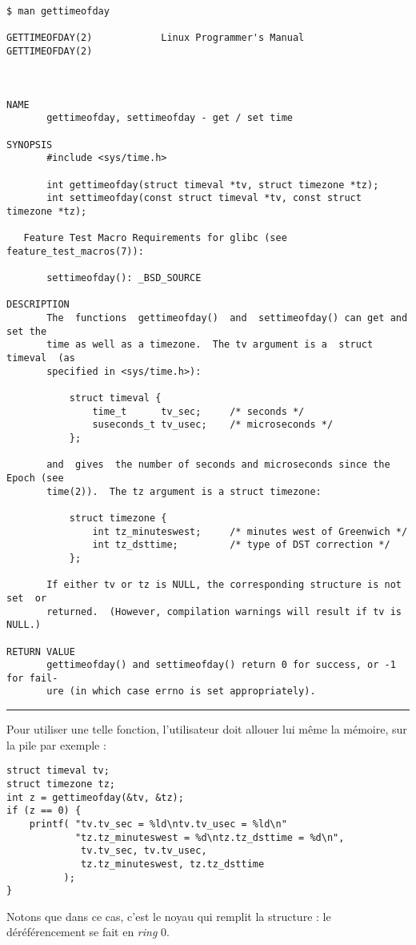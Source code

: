 \begin{verbatim}
$ man gettimeofday

GETTIMEOFDAY(2)            Linux Programmer's Manual           GETTIMEOFDAY(2)



NAME
       gettimeofday, settimeofday - get / set time

SYNOPSIS
       #include <sys/time.h>

       int gettimeofday(struct timeval *tv, struct timezone *tz);
       int settimeofday(const struct timeval *tv, const struct timezone *tz);

   Feature Test Macro Requirements for glibc (see feature_test_macros(7)):

       settimeofday(): _BSD_SOURCE

DESCRIPTION
       The  functions  gettimeofday()  and  settimeofday() can get and set the
       time as well as a timezone.  The tv argument is a  struct  timeval  (as
       specified in <sys/time.h>):

           struct timeval {
               time_t      tv_sec;     /* seconds */
               suseconds_t tv_usec;    /* microseconds */
           };

       and  gives  the number of seconds and microseconds since the Epoch (see
       time(2)).  The tz argument is a struct timezone:

           struct timezone {
               int tz_minuteswest;     /* minutes west of Greenwich */
               int tz_dsttime;         /* type of DST correction */
           };

       If either tv or tz is NULL, the corresponding structure is not  set  or
       returned.  (However, compilation warnings will result if tv is NULL.)

RETURN VALUE
       gettimeofday() and settimeofday() return 0 for success, or -1 for fail‐
       ure (in which case errno is set appropriately).
\end{verbatim}
\begin{center}\rule{3in}{0.4pt}\end{center}

Pour utiliser une telle fonction, l'utilisateur doit allouer lui même la
mémoire, sur la pile par exemple :

\begin{Verbatim}
struct timeval tv;
struct timezone tz;
int z = gettimeofday(&tv, &tz);
if (z == 0) {
    printf( "tv.tv_sec = %ld\ntv.tv_usec = %ld\n"
            "tz.tz_minuteswest = %d\ntz.tz_dsttime = %d\n",
             tv.tv_sec, tv.tv_usec,
             tz.tz_minuteswest, tz.tz_dsttime
          );
}
\end{Verbatim}

Notons que dans ce cas, c'est le noyau qui remplit la structure : le
déréférencement se fait en \emph{ring} 0.
